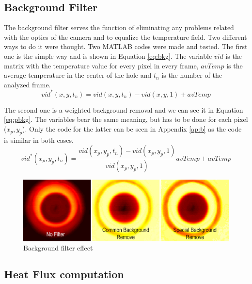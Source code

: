 \subsection{Background Filter}
\par The background filter serves the function of eliminating any problems related with the optics of the camera and to equalize the temperature field. Two different ways to do it were thought. Two MATLAB codes were made and tested. The first one is the simple way and is shown in Equation \ref{eq:bkg}. The variable $vid$ is the matrix with the temperature value for every pixel in every frame, $avTemp$ is the average temperature in the center of the hole and $t_n$ is the number of the analyzed frame.
\begin{equation}\label{eq:bkg}
vid^{*}(x,y,t_n)=vid(x,y,t_n)-vid(x,y,1)+avTemp
\end{equation}
\par The second one is a weighted background removal and we can see it in Equation \ref{eq:pbkg}. The variables bear the same meaning, but has to be done for each pixel ($x_p,y_p$). Only the code for the latter can be seen in Appendix \ref{ap:b} as the code is similar in both cases. 
\begin{equation}\label{eq:pbkg}
vid^{*}(x_p,y_p,t_n)=\frac{vid(x_p,y_p,t_n)-vid(x_p,y_p,1)}{vid(x_p,y_p,1)}avTemp+avTemp
\end{equation}
\begin{figure}[h]
\centering
\includegraphics[width=0.8\linewidth]{Figures/4.Chapter/bkg.png}
\caption{Background filter effect}
\label{fig:bkg}
\end{figure}

\subsection{Heat Flux computation}

